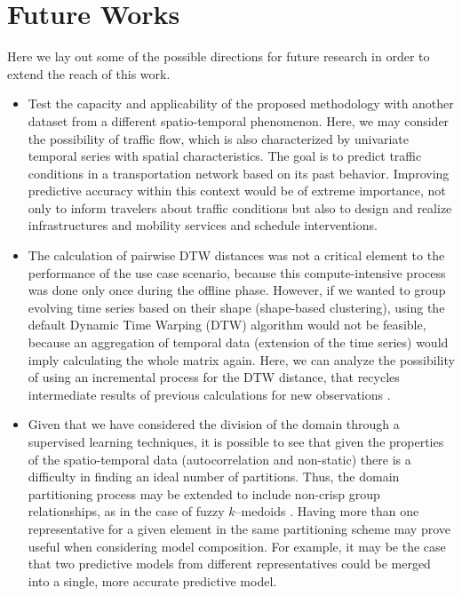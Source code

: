 \section{Future Works}

Here we lay out some of the possible directions for future research in order to extend the reach of this work.

\begin{itemize}
    
    \item Test the capacity and applicability of the proposed methodology with another dataset from a different spatio-temporal phenomenon. Here, we may consider the possibility of traffic flow, which is also characterized by univariate temporal series with spatial characteristics. The goal is to predict traffic conditions in a transportation network based on its past behavior. Improving predictive accuracy within this context would be of extreme importance, not only to inform travelers about traffic conditions but also to design and realize infrastructures and mobility services and schedule interventions.
    
    \item The calculation of pairwise DTW distances was not a critical element to the performance of the use case scenario, because this compute-intensive process was done only once during the offline phase. However, if we wanted to group evolving time series based on their shape (shape-based clustering), using the default Dynamic Time Warping (DTW) algorithm would not be feasible, because an aggregation of temporal data (extension of the time series) would imply calculating the whole matrix again. Here, we can analyze the possibility of using an incremental process for the DTW distance, that recycles intermediate results of previous calculations for new observations \cite{Oregi2017}.
    
    \item Given that we have considered the division of the domain through a supervised learning techniques, it is possible to see that given the properties of the spatio-temporal data (autocorrelation and non-static) there is a difficulty in finding an ideal number of partitions. Thus, the domain partitioning process may be extended to include non-crisp group relationships, as in the case of fuzzy $k$--medoids \cite{Izakian2015}. Having more than one representative for a given element in the same partitioning scheme may prove useful when considering model composition. For example, it may be the case that two predictive models from different representatives could be merged into a single, more accurate predictive model.


\end{itemize}
